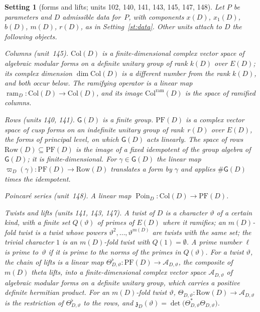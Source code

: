 \documentclass[11pt,a4paper]{article}
\theoremstyle{plainx}
\theoremstyle{uprightx}
\newtheorem{setting}[theorem]{Setting}          %
\newcommand{\scx}[1]{x(#1)}
\newcommand{\scxo}[1]{x_1(#1)}
\newcommand{\scb}[1]{b(#1)}
\newcommand{\Dm}[1]{m(#1)}
\newcommand{\Dr}[1]{r(#1)}
\newcommand{\Row}[1]{\mathrm{Row}(#1)}
\newcommand{\Col}[1]{\mathrm{Col}(#1)}
\newcommand{\Colram}[1]{\mathrm{Col}^{\mathrm{ram}}(#1)}
\newcommand{\GD}[1]{\mathsf{G}(#1)}
\newcommand{\PF}[1]{\mathrm{PF}(#1)}
\newcommand{\Poin}[1]{\operatorname{Poin}_{#1}}
\newcommand{\gpt}[2]{\varpi_{#1}(#2)}
\newcommand{\Th}[2]{\Theta_{#1,#2}}
\newcommand{\Thf}[2]{\Theta^{\flat}_{#1,#2}}
\newcommand{\AAf}[2]{\mathcal{A}_{#1,#2}}
\newcommand{\zz}[2]{\mathfrak{z}_{#1}(#2)}
\begin{document}
\begin{setting}[forms and lifts; units 102, 140, 141, 143, 145, 147, 148]\label{st:forms}
Let $P$ be parameters and $D$ admissible data for~$P$, with components $\scx{D}$, $\scxo{D}$, $\scb{D}$, $\Dm{D}$, $\Dr{D}$, as in
Setting~\ref{st:data}. Other units attach to $D$ the following objects.

\emph{Columns} (unit~145). $\Col{D}$ is a finite-dimensional complex vector space of algebraic modular forms on a
definite unitary group of rank $k(D)$ over $E(D)$; its complex dimension $\dim\Col{D}$ is a different number from the
rank $k(D)$, and both occur below. The \emph{ramifying operator} is a linear map
$\operatorname{ram}_D\colon\Col{D}\to\Col{D}$, and its image $\Colram{D}$ is the space of \emph{ramified columns}.

\emph{Rows} (units 140, 141). $\GD{D}$ is a finite group. $\PF{D}$ is a complex vector space of cusp forms on an
indefinite unitary group of rank~$\Dr{D}$ over $E(D)$, the \emph{forms of principal level}, on which $\GD{D}$ acts
linearly. The space of \emph{rows} $\Row{D}\subseteq\PF{D}$ is the image of a fixed idempotent of the group algebra of
$\GD{D}$; it is finite-dimensional. For $\gamma\in\GD{D}$ the linear map $\gpt{D}{\gamma}\colon\PF{D}\to\Row{D}$
translates a form by $\gamma$ and applies $\#\GD{D}$ times the idempotent.

\emph{Poincaré series} (unit~148). A linear map $\Poin{D}\colon\Col{D}\to\PF{D}$.

\emph{Twists and lifts} (units 141, 143, 147). A \emph{twist} of $D$ is a character $\vartheta$ of a certain kind,
with a finite set $Q(\vartheta)$ of primes of $E(D)$ where it ramifies; an \emph{$\Dm{D}$-fold twist} is a twist whose
powers $\vartheta^{2},\dots,\vartheta^{\Dm{D}}$ are twists with the same set; the trivial character $1$ is an $\Dm{D}$-fold
twist with $Q(1)=\emptyset$. A prime number $\ell$ is \emph{prime to~$\vartheta$} if it is prime to the norms of the
primes in $Q(\vartheta)$. For a twist $\vartheta$, the \emph{chain of lifts} is a linear map
$\Thf{D}{\vartheta}\colon\PF{D}\to\AAf{D}{\vartheta}$, the composite of $\Dm{D}$ theta lifts, into a finite-dimensional
complex vector space $\AAf{D}{\vartheta}$ of algebraic modular forms on a definite unitary group, which carries a
positive definite hermitian product. For an $\Dm{D}$-fold twist $\vartheta$, $\Th{D}{\vartheta}\colon\Row{D}\to\AAf{D}{\vartheta}$
is the restriction of $\Thf{D}{\vartheta}$ to the rows, and
$\zz{D}{\vartheta}=\det\bigl(\Th{D}{\vartheta}^{\ast}\Th{D}{\vartheta}\bigr)$.


\end{setting}
\end{document}
